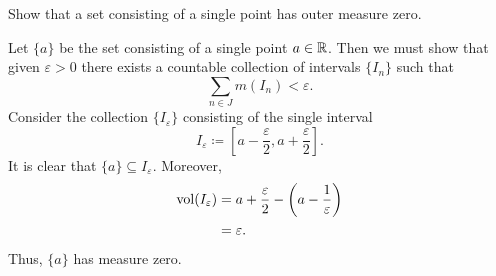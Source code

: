 \begin{problem}
  Show that a set consisting of a single point has outer measure zero.
\end{problem}
\begin{solution}
  Let $\{a\}$ be the set consisting of a single point $a\in\mathbb{R}$. Then we
  must show that given $\varepsilon>0$ there exists a countable collection
  of intervals $\{I_n\}$ such that
  \[
    \sum_{n\in J} m(I_n)<\varepsilon.
  \]
  Consider the collection $\{I_\varepsilon\}$ consisting of the single
  interval
  \[
    I_\varepsilon\coloneq
    \left[a-\frac{\varepsilon}{2},a+\frac{\varepsilon}{2}\right].
  \]
  It is clear that $\{a\}\subseteq I_\varepsilon$. Moreover,
  \begin{align*}
    \operatorname{vol}(I_\varepsilon)
    &=a+\frac{\varepsilon}{2}-\left(a-\frac{1}{\varepsilon}\right)\\
    &=\varepsilon.
  \end{align*}
  Thus, $\{a\}$ has measure zero.
\end{solution}

